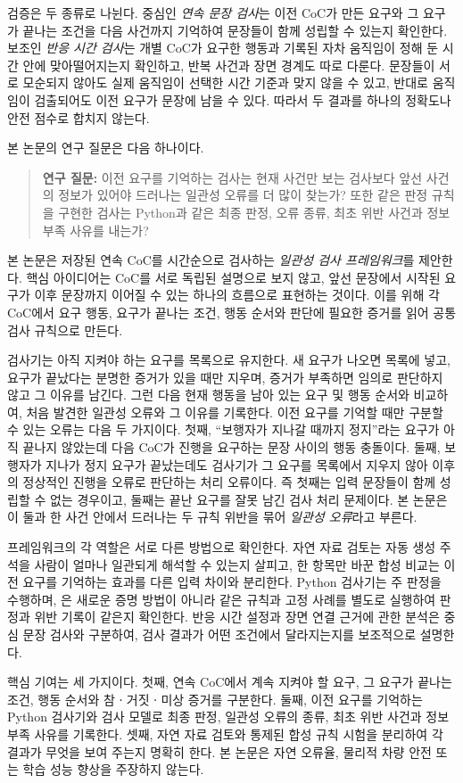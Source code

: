 검증은 두 종류로 나뉜다. 중심인 \emph{연속 문장 검사}는 이전 CoC가 만든 요구와 그 요구가 끝나는 조건을 다음 사건까지 기억하여 문장들이 함께 성립할 수 있는지 확인한다. 보조인 \emph{반응 시간 검사}는 개별 CoC가 요구한 행동과 기록된 자차 움직임이 정해 둔 시간 안에 맞아떨어지는지 확인하고, 반복 사건과 장면 경계도 따로 다룬다. 문장들이 서로 모순되지 않아도 실제 움직임이 선택한 시간 기준과 맞지 않을 수 있고, 반대로 움직임이 검출되어도 이전 요구가 문장에 남을 수 있다. 따라서 두 결과를 하나의 정확도나 안전 점수로 합치지 않는다.

본 논문의 연구 질문은 다음 하나이다.
\begin{quote}
\textbf{연구 질문:} 이전 요구를 기억하는 검사는 현재 사건만 보는 검사보다 앞선 사건의 정보가 있어야 드러나는 일관성 오류를 더 많이 찾는가? 또한 같은 판정 규칙을 구현한 \uppaal 검사는 Python과 같은 최종 판정, 오류 종류, 최초 위반 사건과 정보 부족 사유를 내는가?
\end{quote}

본 논문은 저장된 연속 CoC를 시간순으로 검사하는 \emph{일관성 검사 프레임워크}를 제안한다. 핵심 아이디어는 CoC를 서로 독립된 설명으로 보지 않고, 앞선 문장에서 시작된 요구가 이후 문장까지 이어질 수 있는 하나의 흐름으로 표현하는 것이다. 이를 위해 각 CoC에서 요구 행동, 요구가 끝나는 조건, 행동 순서와 판단에 필요한 증거를 읽어 공통 검사 규칙으로 만든다.

검사기는 아직 지켜야 하는 요구를 목록으로 유지한다. 새 요구가 나오면 목록에 넣고, 요구가 끝났다는 분명한 증거가 있을 때만 지우며, 증거가 부족하면 임의로 판단하지 않고 그 이유를 남긴다. 그런 다음 현재 행동을 남아 있는 요구 및 행동 순서와 비교하여, 처음 발견한 일관성 오류와 그 이유를 기록한다. 이전 요구를 기억할 때만 구분할 수 있는 오류는 다음 두 가지이다. 첫째, ``보행자가 지나갈 때까지 정지''라는 요구가 아직 끝나지 않았는데 다음 CoC가 진행을 요구하는 문장 사이의 행동 충돌이다. 둘째, 보행자가 지나가 정지 요구가 끝났는데도 검사기가 그 요구를 목록에서 지우지 않아 이후의 정상적인 진행을 오류로 판단하는 처리 오류이다. 즉 첫째는 입력 문장들이 함께 성립할 수 없는 경우이고, 둘째는 끝난 요구를 잘못 남긴 검사 처리 문제이다. 본 논문은 이 둘과 한 사건 안에서 드러나는 두 규칙 위반을 묶어 \emph{일관성 오류}라고 부른다.

프레임워크의 각 역할은 서로 다른 방법으로 확인한다. 자연 자료 검토는 자동 생성 주석을 사람이 얼마나 일관되게 해석할 수 있는지 살피고, 한 항목만 바꾼 합성 비교는 이전 요구를 기억하는 효과를 다른 입력 차이와 분리한다. Python 검사기는 주 판정을 수행하며, \uppaal{}은 새로운 증명 방법이 아니라 같은 규칙과 고정 사례를 별도로 실행하여 판정과 위반 기록이 같은지 확인한다. 반응 시간 설정과 장면 연결 근거에 관한 분석은 중심 문장 검사와 구분하여, 검사 결과가 어떤 조건에서 달라지는지를 보조적으로 설명한다.

핵심 기여는 세 가지이다. 첫째, 연속 CoC에서 계속 지켜야 할 요구, 그 요구가 끝나는 조건, 행동 순서와 참ㆍ거짓ㆍ미상 증거를 구분한다. 둘째, 이전 요구를 기억하는 Python 검사기와 \uppaal 검사 모델로 최종 판정, 일관성 오류의 종류, 최초 위반 사건과 정보 부족 사유를 기록한다. 셋째, 자연 자료 검토와 통제된 합성 규칙 시험을 분리하여 각 결과가 무엇을 보여 주는지 명확히 한다. 본 논문은 자연 오류율, 물리적 차량 안전 또는 학습 성능 향상을 주장하지 않는다.
